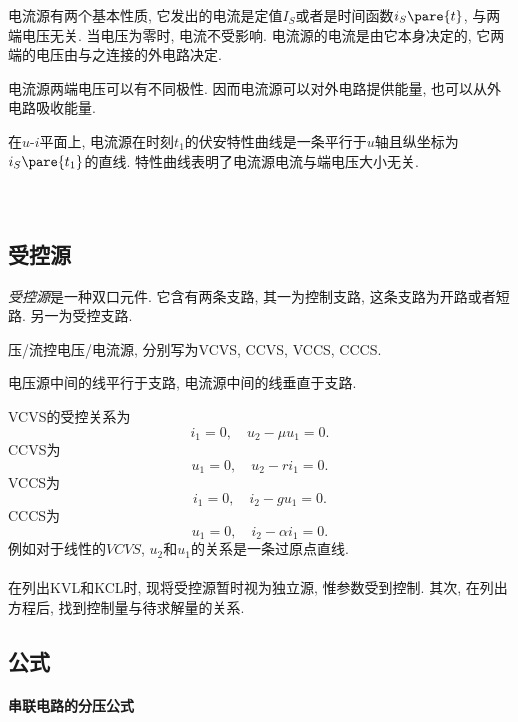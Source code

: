 \documentclass{ctexart}
\begin{document}
电流源有两个基本性质, 它发出的电流是定值$I_S$或者是时间函数$i_S\pare{t}$, 与两端电压无关. 当电压为零时, 电流不受影响. 电流源的电流是由它本身决定的, 它两端的电压由与之连接的外电路决定.
\par
电流源两端电压可以有不同极性. 因而电流源可以对外电路提供能量, 也可以从外电路吸收能量. 
\par
在$u$-$i$平面上, 电流源在时刻$t_1$的伏安特性曲线是一条平行于$u$轴且纵坐标为$i_S\pare{t_1}$的直线. 特性曲线表明了电流源电流与端电压大小无关.\\
\\
\\


\subsection{受控源} %
\label{sub:受控源}

\emph{受控源}是一种双口元件. 它含有两条支路, 其一为控制支路, 这条支路为开路或者短路. 另一为受控支路.
\par
压/流控电压/电流源, 分别写为VCVS, CCVS, VCCS, CCCS.\\
\begin{remark}
    电压源中间的线平行于支路, 电流源中间的线垂直于支路.
\end{remark}
VCVS的受控关系为
\[ i_1 = 0,\quad u_2 - \mu u_1 = 0. \]
CCVS为
\[ u_1 = 0,\quad u_2 - ri_1 = 0. \]
VCCS为
\[ i_1 = 0,\quad i_2 - gu_1 = 0. \]
CCCS为
\[ u_1 = 0,\quad i_2 - \alpha i_1 = 0. \]
例如对于线性的$VCVS$, $u_2$和$u_1$的关系是一条过原点直线.\\
\\
在列出KVL和KCL时, 现将受控源暂时视为独立源, 惟参数受到控制. 其次, 在列出方程后, 找到控制量与待求解量的关系.


\subsection{公式} %
\label{sub:公式}

\paragraph{串联电路的分压公式} %
\label{par:串联电路的分压公式}
\end{document}
